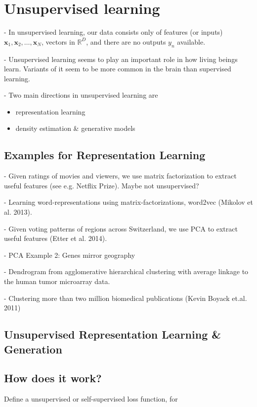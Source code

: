 \section{Unsupervised learning}

- In unsupervised learning, our data consists only of features (or inputs) $\mathbf{x}_{1}, \mathbf{x}_{2}, \ldots, \mathbf{x}_{N}$, vectors in $\mathbb{R}^{D}$, and there are no outputs $y_{n}$ available.

- Unsupervised learning seems to play an important role in how living beings learn. Variants of it seem to be more common in the brain than supervised learning.

- Two main directions in unsupervised learning are

\begin{itemize}
  \item representation learning
  \item density estimation \& generative models
\end{itemize}

\subsection*{Examples for Representation Learning}
- Given ratings of movies and viewers, we use matrix factorization to extract useful features (see e.g. Netflix Prize). Maybe not unsupervised?

- Learning word-representations using matrix-factorizations, word2vec (Mikolov et al. 2013).

- Given voting patterns of regions across Switzerland, we use PCA to extract useful features (Etter et al. 2014).

- PCA Example 2: Genes mirror geography

- Dendrogram from agglomerative hierarchical clustering with average linkage to the human tumor microarray data.

- Clustering more than two million biomedical publications (Kevin Boyack et.al. 2011)

\subsection*{Unsupervised Representation Learning \& Generation}
\subsection*{How does it work?}
Define a unsupervised or self-supervised loss function, for

